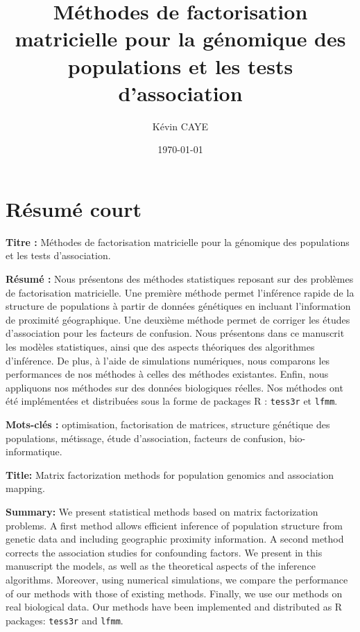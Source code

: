 \documentclass[12pt,a4paper,twoside]{ugathesis}
\author{Kévin CAYE}
\date{\today}
\title{Méthodes de factorisation matricielle pour la génomique des populations et les tests d'association}
\begin{document}
\maketitle
\tableofcontents

\baselineskip 0.7cm
\frontmatter

\chapter{Résumé court}
\label{sec:org1bdcebd}

\noindent \textbf{Titre :} Méthodes de factorisation matricielle pour la génomique des
populations et les tests d'association.

\noindent \textbf{Résumé :} Nous présentons des méthodes statistiques reposant sur des
problèmes de factorisation matricielle. Une première méthode permet l'inférence
rapide de la structure de populations à partir de données génétiques en incluant
l'information de proximité géographique. Une deuxième méthode permet de corriger
les études d'association pour les facteurs de confusion. Nous présentons dans ce
manuscrit les modèles statistiques, ainsi que des aspects théoriques des
algorithmes d'inférence. De plus, à l'aide de simulations numériques, nous
comparons les performances de nos méthodes à celles des méthodes existantes.
Enfin, nous appliquons nos méthodes sur des données biologiques réelles. Nos
méthodes ont été implémentées et distribuées sous la forme de packages R :
\texttt{tess3r} et \texttt{lfmm}.

\noindent \textbf{Mots-clés :} optimisation, factorisation de matrices, structure génétique des
populations, métissage, étude d'association, facteurs de confusion, bio-informatique.

\vspace{0.5cm}

\noindent \textbf{Title:} Matrix factorization methods for population genomics and association
mapping.

\noindent \textbf{Summary:} We present statistical methods based on matrix
factorization problems. A first method allows efficient inference of population
structure from genetic data and including geographic proximity information. A
second method corrects the association studies for confounding factors. We
present in this manuscript the models, as well as the theoretical aspects of the
inference algorithms. Moreover, using numerical simulations, we compare the
performance of our methods with those of existing methods. Finally, we use our
methods on real biological data. Our methods have been implemented and
distributed as R packages: \texttt{tess3r} and \texttt{lfmm}.
\end{document}
